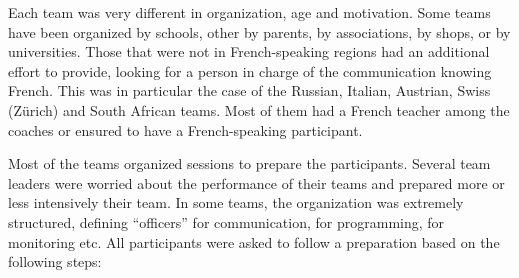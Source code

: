 \documentclass{intech-journal}
\begin{document}
Each team was very different in organization, age and motivation.
Some teams have been organized by schools, other by parents, by associations, by shops, or by universities. 
Those that were not in French-speaking regions had an additional effort to provide, looking for a person in charge of the communication knowing French. 
This was in particular the case of the Russian, Italian, Austrian, Swiss (Z\"urich) and South African teams. 
Most of them had a French teacher among the coaches or ensured to have a French-speaking participant. 

Most of the teams organized sessions to prepare the participants.
Several team leaders were worried about the performance of their teams and prepared more or less intensively their team.
In some teams, the organization was extremely structured, defining ``officers'' for communication, for programming, for monitoring etc.
All participants were asked to follow a preparation based on the following steps:
\end{document}
